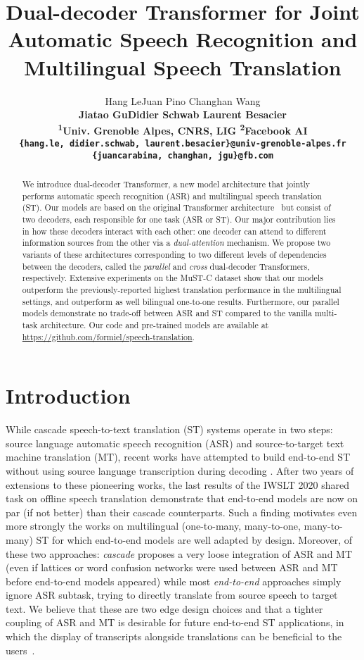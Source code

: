 \documentclass[11pt]{article}
\title{Dual-decoder Transformer for Joint Automatic Speech Recognition and Multilingual Speech Translation}
\author{Hang Le\textsup{1}\qquad Juan Pino\textsup{2} \qquad Changhan Wang\textsup{2}\\\bfseries\large
Jiatao Gu\textsup{2}\qquad Didier Schwab\textsup{1} \qquad Laurent Besacier\textsup{1}\\
{\normalsize\textsuperscript{1}Univ. Grenoble Alpes, CNRS, LIG \qquad \textsuperscript{2}Facebook AI}\\
{\small\tt \{hang.le, didier.schwab, laurent.besacier\}@univ-grenoble-alpes.fr}\\
{\small\tt \{juancarabina, changhan, jgu\}@fb.com}
  }
\date{}
\theoremstyle{plain}
\theoremstyle{definition}
\begin{document}
\maketitle
\begin{abstract}
We introduce dual-decoder Transformer, a new model architecture that jointly performs automatic speech recognition (ASR) and multilingual speech translation (ST). Our models are based on the original Transformer architecture~\cite{vaswani2017attention} but consist of two decoders, each responsible for one task (ASR or ST). Our major contribution lies in how these decoders interact with each other: one decoder can attend to different information sources from the other via a \emph{dual-attention} mechanism. We propose two variants of these architectures corresponding to two different levels of dependencies between the decoders, called the \emph{parallel} and \emph{cross} dual-decoder Transformers, respectively. 
Extensive experiments on the MuST-C dataset show that our models outperform the previously-reported highest translation performance in the multilingual settings, and outperform as well bilingual one-to-one results. Furthermore, our parallel models demonstrate no trade-off between ASR and ST compared to the vanilla multi-task architecture. Our code and pre-trained models are available at \url{https://github.com/formiel/speech-translation}.
\end{abstract}


\section{Introduction}\label{sec:introduction}



While cascade speech-to-text translation (ST) 
systems operate in two steps: source language automatic speech recognition (ASR) and source-to-target text machine translation (MT), recent works have attempted to build end-to-end ST without using source language transcription during decoding \cite{berard-nips2016,weiss2017sequence,DBLP:journals/corr/abs-1802-04200}. After two years of extensions to these pioneering works, the last results of the IWSLT 2020 shared task on offline speech translation \cite{ansari-etal-2020-findings} demonstrate that end-to-end models are now on par (if not better) than their cascade counterparts.  Such a finding motivates even more strongly the works on multilingual (one-to-many, many-to-one, many-to-many) ST \cite{di2019one,inaguma2019multilingual,wang2020covost} for which end-to-end models are well adapted by design.
Moreover, of these two approaches: \textit{cascade} proposes a very loose integration of ASR and MT (even if lattices or word confusion networks were used between ASR and MT before end-to-end models appeared) while most \textit{end-to-end} approaches simply ignore ASR subtask, trying to directly translate from source speech to target text. We believe that these are two edge design choices and that a tighter coupling of ASR and MT is desirable for future end-to-end ST applications, in which the display of transcripts alongside translations can be beneficial to the users~\cite{sperber2020consistent}.
\end{document}
